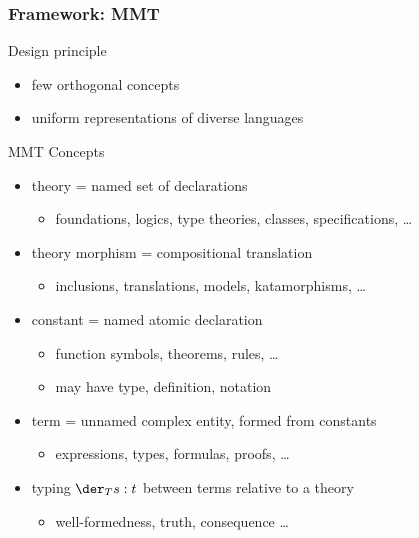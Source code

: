 \documentclass{beamer}
\begin{document}
\begin{frame}\frametitle{Framework: MMT}
Design principle
 \begin{itemize}
   \item few orthogonal concepts
   \item uniform representations of diverse languages
 \end{itemize}

MMT Concepts
\begin{itemize}
  \item theory = named set of declarations\\
    \begin{itemize}
     \item \footnotesize foundations, logics, type theories, classes, specifications, \ldots
    \end{itemize}
  \item theory morphism = compositional translation\\
    \begin{itemize}
     \item \footnotesize inclusions, translations, models, katamorphisms, \ldots
    \end{itemize}
  \item constant = named atomic declaration\\
    \begin{itemize}
      \item \footnotesize function symbols, theorems, rules, \ldots
      \item \footnotesize may have type, definition, notation
    \end{itemize}
  \item term = unnamed complex entity, formed from constants\\
     \begin{itemize}
       \item \footnotesize expressions, types, formulas, proofs, \ldots
     \end{itemize}
  \item typing $\der_T s:t$ between terms relative to a theory\\
    \begin{itemize}
     \item \footnotesize well-formedness, truth, consequence \ldots
    \end{itemize}
\end{itemize}
\end{frame}
\end{document}
